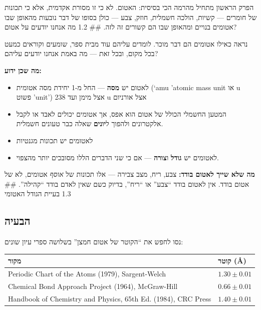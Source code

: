 \documentclass[
  hebrew,
  letterpaper,
  DIV=11,
  numbers=noendperiod]{scrreprt}
\newcounter{none} %
\providecommand{\tightlist}{%
  \setlength{\itemsep}{0pt}\setlength{\parskip}{0pt}}
\begin{document}
הפרק הראשון מתחיל מהרמה הכי בסיסית: האטום. לא כי זו מסורת אקדמית, אלא כי
תכונות של חומרים --- קשיות, הולכה חשמלית, חוזק, צבע --- כולן בסופו של
דבר נובעות מהאופן שבו אטומים בנויים ומהאופן שבו הם קשורים זה לזה. \#\#
1.2 מה אנחנו יודעים על אטום?

נראה כאילו אטומים הם דבר מוכר. לומדים עליהם עוד מבית ספר, שומעים וקוראים
כמעט בכל מקום, ובכל זאת --- מה באמת אנחנו יודעים עליהם?

\textbf{מה שכן ידוע:}

\begin{itemize}
\tightlist
\item
  לאטום יש \textbf{מסה} --- החל מ-1 יחידת מסה אטומית (`amu 'atomic mass
  unit או u פשוט 'unit') אצל מימן ועד 238 u אצל אורניום
\item
  המטען החשמלי הכולל של אטום הוא אפס, אך אטומים יכולים לאבד או לקבל
  אלקטרונים ולהפוך ל\textbf{יונים} שאלה כבר טעונים חשמלית.
\item
  לאטומים יש תכונות מגנטיות
\item
  לאטומים יש \textbf{גודל} ו\textbf{צורה} --- אם כי שני הדברים הללו
  מסובכים יותר מהצפוי.
\end{itemize}

\textbf{מה שלא שייך לאטום בודד:} צבע, ריח, מצב צבירה --- אלו תכונות של
\emph{אוסף} אטומים, לא של אטום בודד. אין לאטום בודד ``צבע'' או ``ריח'',
בדיוק כשם שאין לאדם בודד ``קהילה''. \#\# 1.3 בעיית הגודל האטומי

\subsection{הבעיה}\label{ux5d4ux5d1ux5e2ux5d9ux5d4}

נסו לחפש את ``הקוטר של אטום חמצן'' בשלושה ספרי עיון שונים:

{\def\LTcaptype{none} %
\begin{longtable}[]{@{}
  >{\raggedright\arraybackslash}p{}
  >{\raggedright\arraybackslash}p{}@{}}
\toprule\noalign{}
\begin{minipage}[b]{\linewidth}\raggedright
מקור
\end{minipage} & \begin{minipage}[b]{\linewidth}\raggedright
קוטר (Å)
\end{minipage} \\
\midrule\noalign{}
\endhead
\bottomrule\noalign{}
\endlastfoot
Periodic Chart of the Atoms (1979), Sargent-Welch & \(1.30 \pm 0.01\) \\
Chemical Bond Approach Project (1964), McGraw-Hill &
\(0.66 \pm 0.01\) \\
Handbook of Chemistry and Physics, 65th Ed. (1984), CRC Press &
\(1.40 \pm 0.01\) \\
\end{longtable}
}
\end{document}
